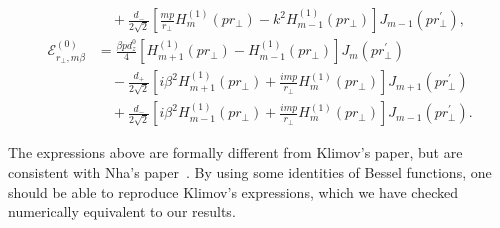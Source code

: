\documentclass[]{report}
\begin{document}
\begin{align}
&\quad+ \frac{d_-}{2\sqrt{2}}\left[\frac{mp}{r\!_\perp}H^{(1)}_m\!\left( pr_\perp \right)-k^2 H^{(1)}_{m-1}\!\left( pr_\perp \right) \right] J_{m-1}\!\left( {pr\!_\perp^{\prime} }\right),\\
\mathcal{E}_{r\!_\perp,m\beta}^{(0)} 
&= \frac{\beta pd^0_z}{4}\left[ H^{(1)}_{m+1}\!\left( pr\!_\perp \right)-H^{(1)}_{m-1}\!\left( pr_\perp \right)\right] J_m\left( {pr\!_\perp^{\prime} }\right)\nonumber\\ 
&\quad -\frac{d_+}{2\sqrt{2}}\left[ i\beta^2H^{(1)}_{m+1}\!\left( pr_\perp \right) +\frac{imp}{r\!_\perp}H^{(1)}_m\!\left( pr_\perp \right)\right] J_{m+1}\!\left( {pr\!_\perp^{\prime} }\right)\nonumber\\
&\quad + \frac{d_-}{2\sqrt{2}}\left[ i\beta^2H^{(1)}_{m-1}\!\left( pr_\perp \right) +\frac{imp}{r\!_\perp}H^{(1)}_m\!\left( pr_\perp \right)\right] J_{m-1}\!\left( {pr\!_\perp^{\prime} }\right).
\end{align}


The expressions above are formally different from Klimov's paper, but are consistent with Nha's paper~\cite{Nha1997}. By using some identities of Bessel functions, one should be able to reproduce Klimov's expressions, which we have checked numerically equivalent to our results.
\end{document}
